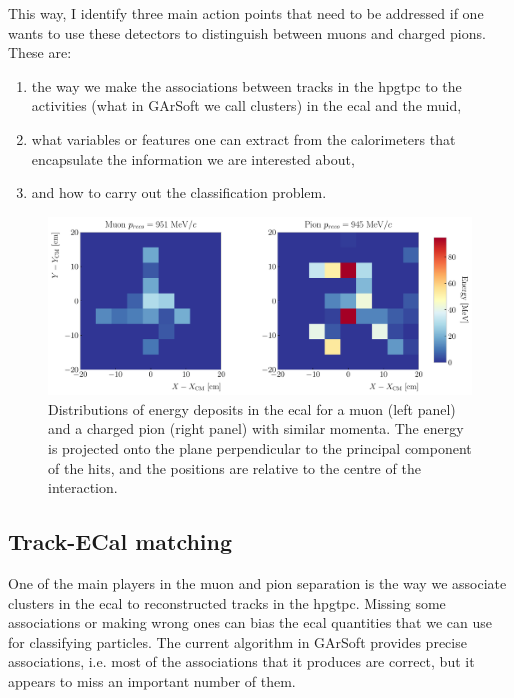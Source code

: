 This way, I identify three main action points that need to be addressed if one wants to use these detectors to distinguish between muons and charged pions. These are:
\begin{enumerate}
	\item the way we make the associations between tracks in the \gls{hpgtpc} to the activities (what in GArSoft we call clusters) in the \gls{ecal} and the \gls{muid},
	\item what variables or features one can extract from the calorimeters that encapsulate the information we are interested about,
	\item and how to carry out the classification problem.
\end{enumerate}

\begin{figure}[t]
	\centering
	\includegraphics[width=.95\linewidth]{Images/GArSoft_PID/BDT/ecal_energy_distribution_example.pdf}
	\caption[Distributions of energy deposits in the \gls{ecal} for a muon and a charged pion with similar momenta.]{Distributions of energy deposits in the \gls{ecal} for a muon (left panel) and a charged pion (right panel) with similar momenta. The energy is projected onto the plane perpendicular to the principal component of the hits, and the positions are relative to the centre of the interaction.}
	\label{fig:ecal_example}
\end{figure}

\subsection{Track-ECal matching}

One of the main players in the muon and pion separation is the way we associate clusters in the \gls{ecal} to reconstructed tracks in the \gls{hpgtpc}. Missing some associations or making wrong ones can bias the \gls{ecal} quantities that we can use for classifying particles. The current algorithm in GArSoft provides precise associations, i.e. most of the associations that it produces are correct, but it appears to miss an important number of them.

